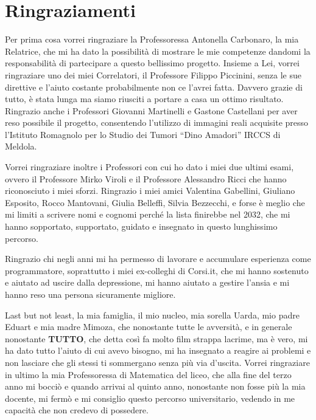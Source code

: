 \chapter*{Ringraziamenti}
\noindent Per prima cosa vorrei ringraziare la Professoressa Antonella Carbonaro, la mia Relatrice, che mi ha dato la possibilità di mostrare le mie competenze dandomi la responsabilità di partecipare a questo bellissimo progetto. Insieme a Lei, vorrei ringraziare uno dei miei Correlatori, il Professore Filippo Piccinini, senza le sue direttive e l'aiuto costante probabilmente non ce l'avrei fatta. Davvero grazie di tutto, è stata lunga ma siamo riusciti a portare a casa un ottimo risultato. Ringrazio anche i Professori Giovanni Martinelli e Gastone Castellani per aver reso possibile il progetto, consentendo l'utilizzo di immagini reali acquisite presso l’Istituto Romagnolo per lo Studio dei Tumori ``Dino Amadori'' IRCCS di Meldola.\hfill\break

\noindent Vorrei ringraziare inoltre i Professori con cui ho dato i miei due ultimi esami, ovvero il Professore Mirko Viroli e il Professore Alessandro Ricci che hanno riconosciuto i miei sforzi. Ringrazio i miei amici Valentina Gabellini, Giuliano Esposito, Rocco Mantovani, Giulia Belleffi, Silvia Bezzecchi, e forse è meglio che mi limiti a scrivere nomi e cognomi perché la lista finirebbe nel 2032, che mi hanno sopportato, supportato, guidato e insegnato in questo lunghissimo percorso.\hfill\break 

\noindent Ringrazio chi negli anni mi ha permesso di lavorare e accumulare esperienza come programmatore, soprattutto i miei ex-colleghi di Corsi.it, che mi hanno sostenuto e aiutato ad uscire dalla depressione, mi hanno aiutato a gestire l'ansia e mi hanno reso una persona sicuramente migliore.\hfill\break

\noindent Last but not least, la mia famiglia, il mio nucleo, mia sorella Uarda, mio padre Eduart e mia madre Mimoza, che nonostante tutte le avversità, e in generale nonostante \textbf{TUTTO}, che detta così fa molto film strappa lacrime, ma è vero, mi ha dato tutto l'aiuto di cui avevo bisogno, mi ha insegnato a reagire ai problemi e non lasciare che gli stessi ti sommergano senza più via d'uscita. Vorrei ringraziare in ultimo la mia Professoressa di Matematica del liceo, che alla fine del terzo anno mi bocciò e quando arrivai al quinto anno, nonostante non fosse più la mia docente, mi fermò e mi consiglio questo percorso universitario, vedendo in me capacità che non credevo di possedere.